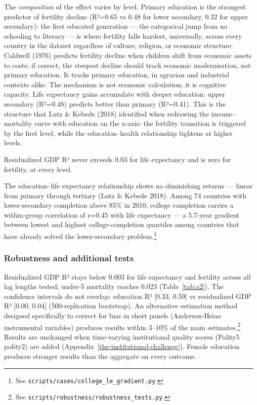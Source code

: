 \documentclass[12pt,letterpaper]{article}
\begin{document}
The \emph{composition} of the
effect varies by level. Primary education is
the strongest predictor of fertility decline (R²=0.65 vs 0.48 for lower
secondary, 0.32 for upper secondary): the first educated generation ---
the categorical jump from no schooling to literacy --- is where
fertility falls hardest, universally, across every country in the
dataset regardless of culture, religion, or economic structure.
Caldwell (1976) predicts fertility decline when children shift from economic
assets to costs; if correct, the steepest decline should track economic
modernisation, not primary education. It tracks primary education, in
agrarian and industrial contexts alike. The mechanism is not economic
calculation; it is cognitive capacity.
Life expectancy gains accumulate
with deeper education: upper secondary (R²=0.48) predicts better than
primary (R²=0.41). This is the structure that Lutz \& Kebede
(2018) identified when redrawing the income--mortality curve with education on the
x-axis: the fertility transition is triggered by the first level, while
the education--health relationship tightens at higher levels.

Residualized GDP R² never exceeds 0.03 for life
expectancy and is zero for fertility, at every level.

The education--life expectancy relationship shows no diminishing returns ---
linear from primary through
tertiary (Lutz \& Kebede 2018). Among 74 countries with lower-secondary
completion above 85\% in 2010, college completion carries a within-group
correlation of r=0.45 with life expectancy --- a 5.7-year gradient
between lowest and highest college-completion quartiles among countries
that have already solved the lower-secondary problem.\footnote{See
\texttt{scripts/cases/college\_le\_gradient.py}.}

\subsubsection*{Robustness and additional tests}

Residualized GDP R² stays below 0.003 for life expectancy and fertility
across all lag lengths tested; under-5 mortality reaches 0.023
(Table~\ref{tab:a2}). The confidence intervals do not overlap: education R²
[0.33, 0.59] vs residualized GDP R² [0.00, 0.04] (500-replication
bootstrap). An alternative estimation method designed
specifically to correct for bias in short panels (Anderson-Hsiao
instrumental variables) produces results within 3--10\% of the main
estimates.\footnote{See \texttt{scripts/robustness/robustness\_tests.py}.} Results are unchanged when time-varying institutional quality scores (Polity5 polity2) are added (Appendix~\ref{the-institutional-challenge}). Female
education produces stronger results than the aggregate on every outcome.
\end{document}
